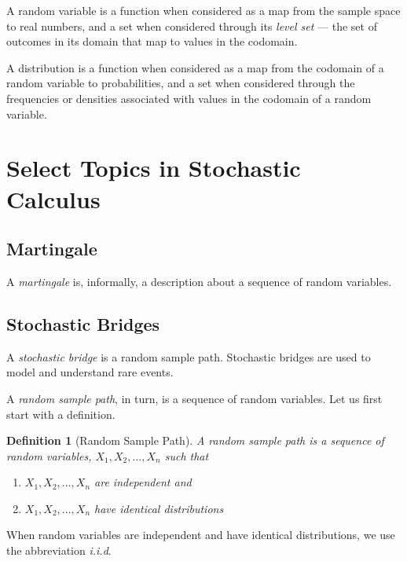 \documentclass{article}
\newtheorem{definition}{Definition}
\begin{document}
A random variable is a function when considered as a map from the sample space to real numbers, and a set when considered through its \emph{level set} — the set of outcomes in its domain that map to values in the codomain.

A distribution is a function when considered as a map from the codomain of a random variable to probabilities, and a set when considered through the frequencies or densities associated with values in the codomain of a random variable.

\newpage
\section{Select Topics in Stochastic Calculus}

\subsection{Martingale}
A \emph{martingale} is, informally, a description about a sequence of random variables.

\subsection{Stochastic Bridges}
A \emph{stochastic bridge} is a random sample path. Stochastic bridges are used to model and understand rare events.

A \emph{random sample path}, in turn, is a sequence of random variables. Let us first start with a definition.

\begin{mdframed}
\begin{definition}[Random Sample Path]
A \emph{random sample path} is a sequence of random variables, $ X_1, X_2,...,X_n $ such that

\begin{enumerate}
    \item $X_1, X_2, ..., X_n$ are independent \quad and
    \item $X_1, X_2, ..., X_n$ have identical distributions
\end{enumerate}
\end{definition}
\end{mdframed}

When random variables are independent and have identical distributions, we use the abbreviation \emph{i.i.d}.
\end{document}
